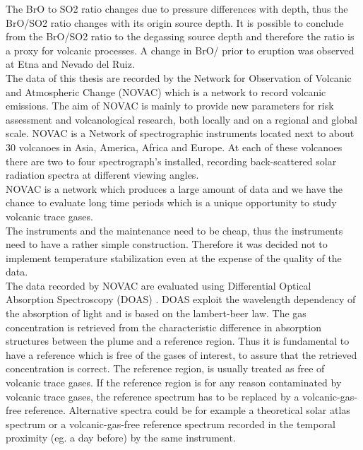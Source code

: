 The BrO to SO2 ratio changes due to pressure differences with depth, thus the BrO/SO2 ratio changes with its origin source depth. It is possible to conclude from the BrO/SO2 ratio to the degassing source depth and therefore the ratio is a proxy for volcanic processes. A change in BrO/ prior to eruption was observed at Etna and Nevado del Ruiz.\\
%
\newline
%
The data of this thesis are recorded by the Network for Observation of Volcanic and Atmospheric Change (NOVAC) which is a network to record volcanic emissions. The aim of NOVAC is mainly to provide new parameters for risk assessment and volcanological research, both locally and on a regional and global scale.
NOVAC is a Network of spectrographic instruments located next to about 30 volcanoes in Asia, America, Africa and Europe. At each of these volcanoes there are two to four spectrograph's installed, recording back-scattered solar radiation spectra at different viewing angles.\\
NOVAC is a network which produces a large amount of data and we have the chance to evaluate long time periods which is a unique opportunity to study volcanic trace gases.\\
The instruments and the maintenance need to be cheap, thus the instruments need to have a rather simple construction. Therefore it was decided not to implement temperature stabilization even at the expense of the quality of the data.\\
%
\newline
%
The data recorded by NOVAC are evaluated using Differential Optical Absorption Spectroscopy (DOAS) \cite{platt2008differential}. DOAS exploit the wavelength dependency of the absorption of light and is based on the lambert-beer law. The gas concentration is retrieved from the characteristic difference in absorption structures between the plume and a reference region. Thus it is fundamental to have a reference which is free of the gases of interest, to assure that the retrieved concentration is correct.
%
\newline
%
The reference region, is usually treated as free of
volcanic trace gases. If the reference region is for any reason
contaminated by volcanic trace gases, the reference spectrum has to be
replaced by a volcanic-gas-free reference. Alternative spectra could be for example a
theoretical solar atlas spectrum or a volcanic-gas-free reference
spectrum recorded in the temporal proximity (eg. a day before) by the same instrument.
